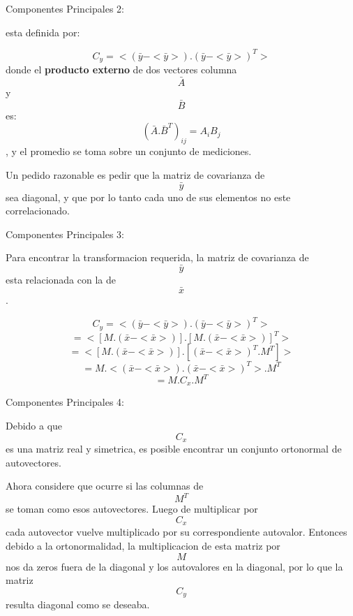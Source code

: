 \documentclass[ignorenonframetext,]{beamer}
\begin{document}
\begin{frame}

\begin{block}{Componentes Principales 2:}

esta definida por:

\[C_{y}=< (\bar{y}-<\bar{y}>).(\bar{y}-<\bar{y}>)^{T}>\] donde el
\textbf{producto externo} de dos vectores columna \[\bar{A}\] y
\[\bar{B}\] es: \[(\bar{A}.\bar{B}^{T})_{ij}=A_{i}B_{j}\], y el promedio
se toma sobre un conjunto de mediciones.

Un pedido razonable es pedir que la matriz de covarianza de \[\bar{y}\]
sea diagonal, y que por lo tanto cada uno de sus elementos no este
correlacionado.

\end{block}

\end{frame}

\begin{frame}

\begin{block}{Componentes Principales 3:}

Para encontrar la transformacion requerida, la matriz de covarianza de
\[\bar{y}\] esta relacionada con la de \[\bar{x}\].

\[C_{y}=< (\bar{y}-<\bar{y}>).(\bar{y}-<\bar{y}>)^{T}> \]
\[      =<[M.(\bar{x}-<\bar{x}>)].[M.(\bar{x}-<\bar{x}>)]^{T}> \]
\[      =<[M.(\bar{x}-<\bar{x}>)].[(\bar{x}-<\bar{x}>)^{T}.M^{T}]>\]
\[      =M.<(\bar{x}-<\bar{x}>).(\bar{x}-<\bar{x}>)^{T}>.M^{T}\]
\[      =M.C_{x}.M^{T}\]

\end{block}

\end{frame}

\begin{frame}

\begin{block}{Componentes Principales 4:}

Debido a que \[C_{x}\] es una matriz real y simetrica, es posible
encontrar un conjunto ortonormal de autovectores.

Ahora considere que ocurre si las columnas de \[M^{T}\] se toman como
esos autovectores. Luego de multiplicar por \[C_{x}\] cada autovector
vuelve multiplicado por su correspondiente autovalor. Entonces debido a
la ortonormalidad, la multiplicacion de esta matriz por \[M\] nos da
zeros fuera de la diagonal y los autovalores en la diagonal, por lo que
la matriz \[C_{y}\] resulta diagonal como se deseaba.

\end{block}

\end{frame}
\end{document}
